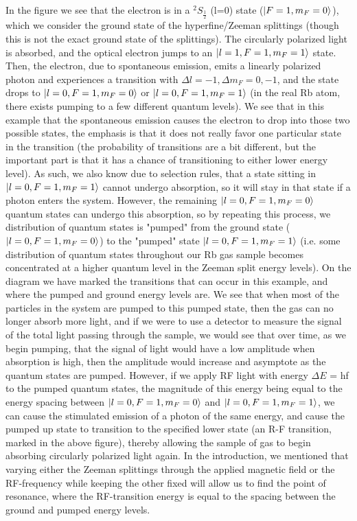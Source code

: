 \documentclass{article}
\begin{document}
    \indent In the figure we see that the electron is in a $^2S_{\frac{1}{2}}$ (l=0) state ($\ket{F=1,m_F = 0}$), which we consider the ground state of the hyperfine/Zeeman splittings (though this is not the exact ground state of the splittings). The circularly polarized light is absorbed, and the optical electron jumps to an $\ket{l=1,F=1,m_F=1}$ state. Then, the electron, due to spontaneous emission, emits a linearly polarized photon and experiences a transition with $\Delta l = -1, \Delta m_F = 0,-1$, and the state drops to $\ket{l=0,F=1,m_F=0}$ or $\ket{l=0,F=1,m_F=1}$ (in the real Rb atom, there exists pumping to a few different quantum levels). We see that in this example that the spontaneous emission causes the electron to drop into those two possible states, the emphasis is that it does not really favor one particular state in the transition (the probability of transitions are a bit different, but the important part is that it has a chance of transitioning to either lower energy level). As such, we also know due to selection rules, that a state sitting in $\ket{l=0,F=1,m_F=1}$ cannot undergo absorption, so it will stay in that state if a photon enters the system. However, the remaining $\ket{l=0,F=1,m_F=0}$ quantum states can undergo this absorption, so by repeating this process, we distribution of quantum states is "pumped" from the ground state ($\ket{l=0,F=1,m_F=0}$) to the "pumped" state $\ket{l=0,F=1,m_F=1}$ (i.e. some distribution of quantum states throughout our Rb gas sample becomes concentrated at a higher quantum level in the Zeeman split energy levels). On the diagram we have marked the transitions that can occur in this example, and where the pumped and ground energy levels are. We see that when most of the particles in the system are pumped to this pumped state, then the gas can no longer absorb more light, and if we were to use a detector to measure the signal of the total light passing through the sample, we would see that over time, as we begin pumping, that the signal of light would have a low amplitude when absorption is high, then the amplitude would increase and asymptote as the quantum states are pumped. However, if we apply RF light with energy $\Delta E$ = hf to the pumped quantum states, the magnitude of this energy being equal to the energy spacing between $\ket{l=0,F=1,m_F=0}$ and $\ket{l=0,F=1,m_F=1}$, we can cause the stimulated emission of a photon of the same energy, and cause the pumped up state to transition to the specified lower state (an R-F transition, marked in the above figure), thereby allowing the sample of gas to begin absorbing circularly polarized light again. In the introduction, we mentioned that varying either the Zeeman splittings through the applied magnetic field or the RF-frequency while keeping the other fixed will allow us to find the point of resonance, where the RF-transition energy is equal to the spacing between the ground and pumped energy levels.
\end{document}
